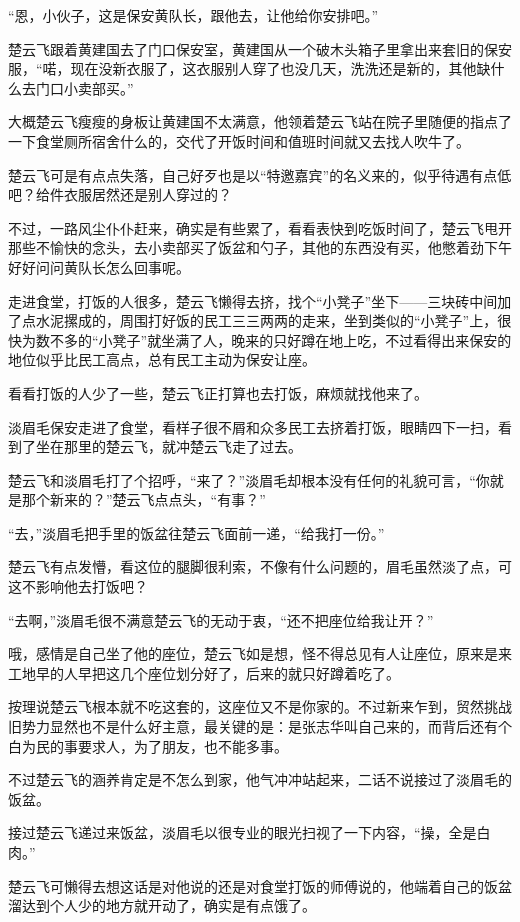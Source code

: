 “恩，小伙子，这是保安黄队长，跟他去，让他给你安排吧。”

楚云飞跟着黄建国去了门口保安室，黄建国从一个破木头箱子里拿出来套旧的保安服，“喏，现在没新衣服了，这衣服别人穿了也没几天，洗洗还是新的，其他缺什么去门口小卖部买。”

大概楚云飞瘦瘦的身板让黄建国不太满意，他领着楚云飞站在院子里随便的指点了一下食堂厕所宿舍什么的，交代了开饭时间和值班时间就又去找人吹牛了。

楚云飞可是有点点失落，自己好歹也是以“特邀嘉宾”的名义来的，似乎待遇有点低吧？给件衣服居然还是别人穿过的？

不过，一路风尘仆仆赶来，确实是有些累了，看看表快到吃饭时间了，楚云飞甩开那些不愉快的念头，去小卖部买了饭盆和勺子，其他的东西没有买，他憋着劲下午好好问问黄队长怎么回事呢。

走进食堂，打饭的人很多，楚云飞懒得去挤，找个“小凳子”坐下——三块砖中间加了点水泥摞成的，周围打好饭的民工三三两两的走来，坐到类似的“小凳子”上，很快为数不多的“小凳子”就坐满了人，晚来的只好蹲在地上吃，不过看得出来保安的地位似乎比民工高点，总有民工主动为保安让座。

看看打饭的人少了一些，楚云飞正打算也去打饭，麻烦就找他来了。

淡眉毛保安走进了食堂，看样子很不屑和众多民工去挤着打饭，眼睛四下一扫，看到了坐在那里的楚云飞，就冲楚云飞走了过去。

楚云飞和淡眉毛打了个招呼，“来了？”淡眉毛却根本没有任何的礼貌可言，“你就是那个新来的？”楚云飞点点头，“有事？”

“去，”淡眉毛把手里的饭盆往楚云飞面前一递，“给我打一份。”

楚云飞有点发懵，看这位的腿脚很利索，不像有什么问题的，眉毛虽然淡了点，可这不影响他去打饭吧？

“去啊，”淡眉毛很不满意楚云飞的无动于衷，“还不把座位给我让开？”

哦，感情是自己坐了他的座位，楚云飞如是想，怪不得总见有人让座位，原来是来工地早的人早把这几个座位划分好了，后来的就只好蹲着吃了。

按理说楚云飞根本就不吃这套的，这座位又不是你家的。不过新来乍到，贸然挑战旧势力显然也不是什么好主意，最关键的是：是张志华叫自己来的，而背后还有个白为民的事要求人，为了朋友，也不能多事。

不过楚云飞的涵养肯定是不怎么到家，他气冲冲站起来，二话不说接过了淡眉毛的饭盆。

接过楚云飞递过来饭盆，淡眉毛以很专业的眼光扫视了一下内容，“操，全是白肉。”

楚云飞可懒得去想这话是对他说的还是对食堂打饭的师傅说的，他端着自己的饭盆溜达到个人少的地方就开动了，确实是有点饿了。

